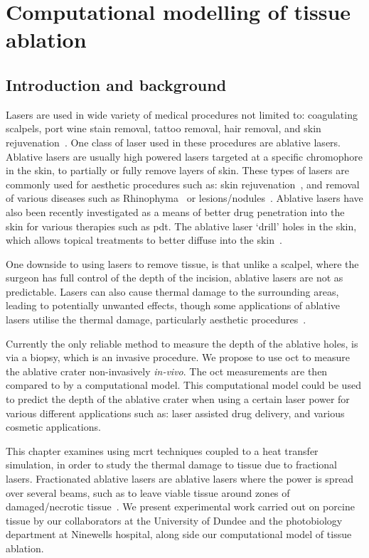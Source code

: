 \chapter{Computational modelling of tissue ablation}
\label{chap:ablation}
\section{Introduction and background}
Lasers are used in wide variety of medical procedures not limited to: coagulating scalpels, port wine stain removal, tattoo removal, hair removal, and skin rejuvenation~\cite{amini2010ultrafast, tan1989treatment,kuperman2001laser,liew2002laser,hardaway2002nonablative}.
One class of laser used in these procedures are ablative lasers. Ablative lasers are usually high powered lasers targeted at a specific chromophore in the skin, to partially or fully remove layers of skin. These types of lasers are commonly used for aesthetic procedures such as: skin rejuvenation~\cite{hardaway2002nonablative}, and removal of various diseases such as Rhinophyma~\cite{shapshay1980removal} or lesions/nodules~\cite{valcavi2010percutaneous}. Ablative lasers have also been recently investigated as a means of better drug penetration into the skin for various therapies such as \gls{pdt}. The ablative laser `drill' holes in the skin, which allows topical treatments to better diffuse into the skin~\cite{haedersdal2010fractional}.

One downside to using lasers to remove tissue, is that unlike a scalpel, where the surgeon has full control of the depth of the incision, ablative lasers are not as predictable. Lasers can also cause  thermal damage to the surrounding areas, leading to potentially  unwanted effects, though some applications of ablative lasers utilise the thermal damage, particularly aesthetic procedures~\cite{alexiades2008spectrum}.

 Currently the only reliable method to measure the depth of the ablative holes, is via a biopsy, which is an invasive procedure. We propose to use \gls{oct} to measure the ablative crater non-invasively \textit{in-vivo}. The \gls{oct} measurements are then compared to by a computational model. This computational model could be used to predict the depth of the ablative crater when using a certain laser power for various different applications such as: laser assisted drug delivery, and various cosmetic applications.

\medskip

This chapter examines using \gls{mcrt} techniques coupled to a heat transfer simulation, in order to study the thermal damage to tissue due to fractional lasers. Fractionated ablative lasers  are ablative lasers where the power is spread over several beams, such as to leave viable tissue around zones of damaged/necrotic tissue~\cite{manstein2004fractional}. We present experimental work carried out on porcine tissue by our collaborators at the University of Dundee and the photobiology department at Ninewells hospital, along side our computational model of tissue ablation.

